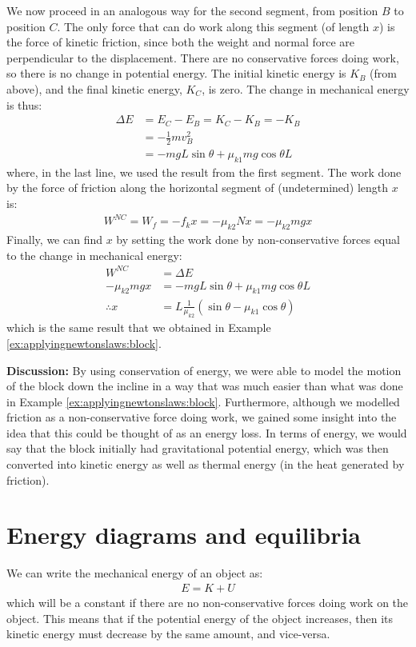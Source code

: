 \begin{example}
We now proceed in an analogous way for the second segment, from position $B$ to position $C$. The only force that can do work along this segment (of length $x$) is the force of kinetic friction, since both the weight and normal force are perpendicular to the displacement. There are no conservative forces doing work, so there is no change in potential energy. The initial kinetic energy is $K_B$ (from above), and the final kinetic energy, $K_C$, is zero. The change in mechanical energy is thus:
\begin{align*}
\Delta E &= E_C - E_B = K_C - K_B = -K_B\\
&=-\frac{1}{2}mv_B^2\\
&=- mgL\sin\theta+\mu_{k1}mg\cos\theta L 
\end{align*}
where, in the last line, we used the result from the first segment. The work done by the force of friction along the horizontal segment of (undetermined) length $x$ is:
\begin{align*}
W^{NC}=W_f = -f_kx = -\mu_{k2} N x=-\mu_{k2} mg x
\end{align*}
Finally, we can find $x$ by setting the work done by non-conservative forces equal to the change in mechanical energy:
\begin{align*}
W^{NC} &= \Delta E\\
-\mu_{k2} mg x &=- mgL\sin\theta+\mu_{k1}mg\cos\theta L \\
\therefore x&= L\frac{1}{\mu_{k2}}\left(\sin\theta - \mu_{k1}\cos\theta\right)
\end{align*}
which is the same result that we obtained in Example \ref{ex:applyingnewtonslaws:block}.

\textbf{Discussion:} By using conservation of energy, we were able to model the motion of the block down the incline in a way that was much easier than what was done in Example \ref{ex:applyingnewtonslaws:block}. Furthermore, although we modelled friction as a non-conservative force doing work, we gained some insight into the idea that this could be thought of as an energy loss. In terms of energy, we would say that the block initially had gravitational potential energy, which was then converted into kinetic energy as well as thermal energy (in the heat generated by friction). 
\end{example}

\section{Energy diagrams and equilibria}
\label{sec:potentialecons:ediagrams}
We can write the mechanical energy of an object as:
\begin{align*}
E = K + U
\end{align*}
which will be a constant if there are no non-conservative forces doing work on the object. This means that if the potential energy of the object increases, then its kinetic energy must decrease by the same amount, and vice-versa. 

